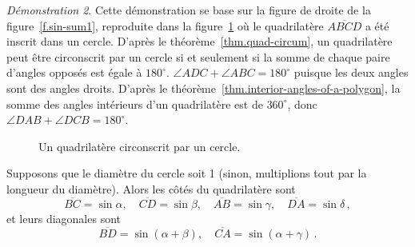 \noindent \emph{Démonstration 2}. 
Cette démonstration se base sur la figure  de droite de la figure~\ref{f.sin-sum1},  reproduite dans la figure~\ref{f.trig-quad-circle} où le quadrilatère $\overline{ABCD}$ a été inscrit dans un cercle. D'après le théorème~\ref{thm.quad-circum}, un quadrilatère peut être circonscrit par un cercle si et seulement si la somme de chaque paire d'angles opposés est égale à $180^\circ$.
$\angle ADC+\angle ABC=180^\circ$ puisque les deux angles sont des angles droits. D'après le théorème~\ref{thm.interior-angles-of-a-polygon}, la somme des angles intérieurs d'un quadrilatère est de $360^\circ$, donc $\angle DAB+\angle DCB=180^\circ$. 
\begin{figure}[htbp]
\centering

\caption{Un quadrilatère circonscrit par un cercle.}\label{f.trig-quad-circle}
\end{figure}

Supposons que le diamètre du cercle soit 1 (sinon, multiplions tout par la longueur du diamètre). Alors les côtés du quadrilatère sont 
\[
\overline{BC}=\sin\alpha,\quad \overline{CD}=\sin\beta,\quad \overline{AB}=\sin\gamma,\quad \overline{DA}=\sin\delta\,,
\]
et leurs diagonales sont 
\[
\overline{BD}=\sin(\alpha + \beta),\quad \overline{CA}=\sin (\alpha+\gamma)\,.
\]

